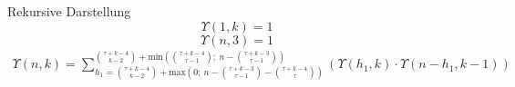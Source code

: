 \begin{frame}{Rekursive Darstellung}
    \[\Upsilon(1,k)=1\]
    \[\Upsilon(n,3) = 1\]
    {\small \begin{align*}
        \Upsilon(n,k) 
        =\sum  _{h_1 = \binom{\tau+k-4}{k-2}+\mathrm{max} \left(0;\ n-\binom{\tau+k-3}{\tau-1} - \binom{\tau+k-4}{\tau} \right)}
                ^{\binom{\tau+k-4}{k-2}+\mathrm{min}\left(\binom{\tau+k-4}{\tau-1};\ n-\binom{\tau+k-3}{\tau-1}\right)}
            \left(
                \Upsilon(h_1,k) \cdot \Upsilon(n-h_1,k-1) 
            \right)
    \end{align*}
    }
\end{frame}